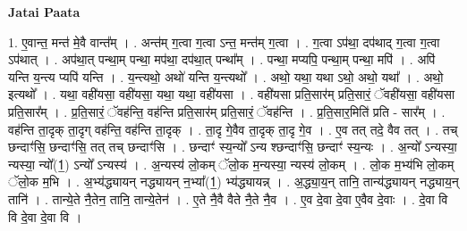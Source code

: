 \documentclass[17pt]{extarticle}
\begin{document}
\textbf{Jatai Paata} \newline

1. ए॒वान्त॒ मन्त॑ मे॒वै वान्त᳚म् । . अन्त॑म् ग॒त्वा ग॒त्वा ऽन्त॒ मन्त॑म् ग॒त्वा । . ग॒त्वा ऽप॑था॒ दप॑थाद् ग॒त्वा ग॒त्वा ऽप॑थात् । . अप॑था॒त् पन्था॒म् पन्था॒ मप॑था॒ दप॑था॒त् पन्था᳚म् । . पन्था॒ मप्यपि॒ पन्था॒म् पन्था॒ मपि॑ । . अपि॑ यन्ति य॒न्त्य प्यपि॑ यन्ति । . य॒न्त्यथो॒ अथो॑ यन्ति य॒न्त्यथो᳚ । . अथो॒ यथा॒ यथा ऽथो॒ अथो॒ यथा᳚ । . अथो॒ इत्यथो᳚ । . यथा॒ वही॑यसा॒ वही॑यसा॒ यथा॒ यथा॒ वही॑यसा । . वही॑यसा प्रति॒सार॑म् प्रति॒सारं॒ ॅवही॑यसा॒ वही॑यसा प्रति॒सार᳚म् । . प्र॒ति॒सारं॒ ॅवह॑न्ति॒ वह॑न्ति प्रति॒सार॑म् प्रति॒सारं॒ ॅवह॑न्ति । . प्र॒ति॒सार॒मिति॑ प्रति - सार᳚म् । . वह॑न्ति ता॒दृक् ता॒दृग् वह॑न्ति॒ वह॑न्ति ता॒दृक् । . ता॒दृ गे॒वैव ता॒दृक् ता॒दृ गे॒व । . ए॒व तत् तदे॒ वैव तत् । . तच् छन्दाꣳ॑सि॒ छन्दाꣳ॑सि॒ तत् तच् छन्दाꣳ॑सि । . छन्दाꣳ॑ स्य॒न्यो᳚ ऽन्य श्छन्दाꣳ॑सि॒ छन्दाꣳ॑ स्य॒न्यः । . अ॒न्यो᳚ ऽन्यस्या॒ न्यस्या॒ न्यो᳚(1॒) ऽन्यो᳚ ऽन्यस्य॑ । . अ॒न्यस्य॑ लो॒कम् ॅलो॒क म॒न्यस्या॒ न्यस्य॑ लो॒कम् । . लो॒क म॒भ्य॑भि लो॒कम् ॅलो॒क म॒भि । . अ॒भ्य॑द्ध्यायन् नद्ध्यायन् न॒भ्या᳚(1॒) भ्य॑द्ध्यायन्न् । . अ॒द्ध्या॒य॒न् तानि॒ तान्य॑द्ध्यायन् नद्ध्याय॒न् तानि॑ । . तान्ये॒ते नै॒तेन॒ तानि॒ तान्ये॒तेन॑ । . ए॒ते नै॒वै वैते नै॒ते नै॒व । . ए॒व दे॒वा दे॒वा ए॒वैव दे॒वाः । . दे॒वा वि वि दे॒वा दे॒वा वि । \newline
\end{document}
